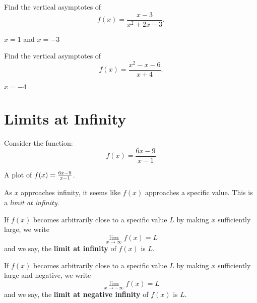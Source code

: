 \begin{exercises}
\endtwocol


\begin{exercise}
Find the vertical asymptotes of
\[
f(x) = \frac{x-3}{x^2+2x-3}.
\]
\begin{answer}
  $x = 1$ and $x = -3$
\end{answer}
\end{exercise}


\begin{exercise}
Find the vertical asymptotes of
\[
f(x) = \frac{x^2-x-6}{x+4}.
\]
\begin{answer}
  $x = -4$
\end{answer}
\end{exercise}
\end{exercises}






\section{Limits at Infinity}


Consider the function:
\[
f(x) = \frac{6x-9}{x-1}
\]
\begin{marginfigure}[0in]
\caption{A plot of $f(x)=\protect\frac{6x-9}{x-1}$.}
\label{plot:(x^2-9x+14)/(x^2-5x+6)}
\end{marginfigure}
As $x$ approaches infinity, it seems like $f(x)$ approaches a specific
value. This is a \textit{limit at infinity}.

\begin{definition}\label{def:limitAtInfty}
If $f(x)$ becomes arbitrarily close to a specific value $L$ by making
$x$ sufficiently large, we write
\[
\lim_{x\to \infty} f(x) = L
\]
and we say, the \textbf{limit at infinity} of $f(x)$ is $L$.  

If $f(x)$ becomes
arbitrarily close to a specific value $L$ by making $x$ sufficiently
large and negative, we write
\[
\lim_{x\to -\infty} f(x) = L
\]
and we say, the \textbf{limit at negative infinity} of $f(x)$ is $L$.  
\end{definition}

